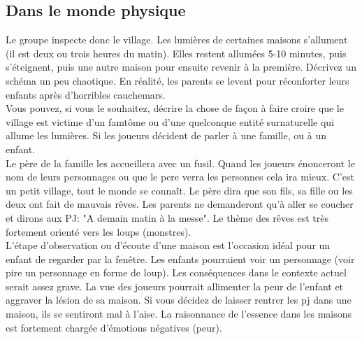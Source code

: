 \documentclass[oneside,12pt]{book}
\begin{document}
\begin{flushleft}
\subsection{Dans le monde physique}
\label{physique_enquete}
Le groupe inspecte donc le village. 
Les lumières de certaines maisons s'allument (il est deux ou trois heures du matin).
Elles restent allumées 5-10 minutes, puis s’éteignent, puis une autre maison pour ensuite revenir à la première. Décrivez un schéma un peu chaotique.
En réalité, les parents se levent pour réconforter leurs enfants après d'horribles cauchemars. \\
Vous pouvez, si vous le souhaitez, décrire la chose de façon à faire croire que le village est 
victime d'un famtôme ou d'une quelconque entité surnaturelle qui allume les lumières.
Si les joueurs décident de parler à une famille, ou à un enfant. \\
Le père de la famille les accueillera avec un fusil. Quand les joueurs énonceront le nom de leurs personnages ou que le pere verra les personnes cela ira mieux.
C'est un petit village, tout le monde se connaît.
Le père dira que son fils, sa fille ou les deux ont fait de mauvais rêves. 
Les parents ne demanderont qu'à aller se coucher et dirons aux PJ: "A demain matin à la messe".
Le thème des rêves est très fortement orienté vers les loups (monstres). \\
L'étape d'observation ou d'écoute d'une maison est l'occasion idéal pour un enfant de regarder par la fenêtre. 
Les enfants pourraient voir un personnage (voir pire un personnage en forme de loup). Les conséquences dans le contexte actuel serait assez grave. 
La vue des joueurs pourrait allimenter la peur de l'enfant et aggraver la lésion de sa maison.
Si vous décidez de laisser rentrer les pj dans une maison, ils se sentiront mal à l'aise. La raisonnance de l'essence dans les maisons est fortement chargée d'émotions négatives (peur).


\end{flushleft}
\end{document}
